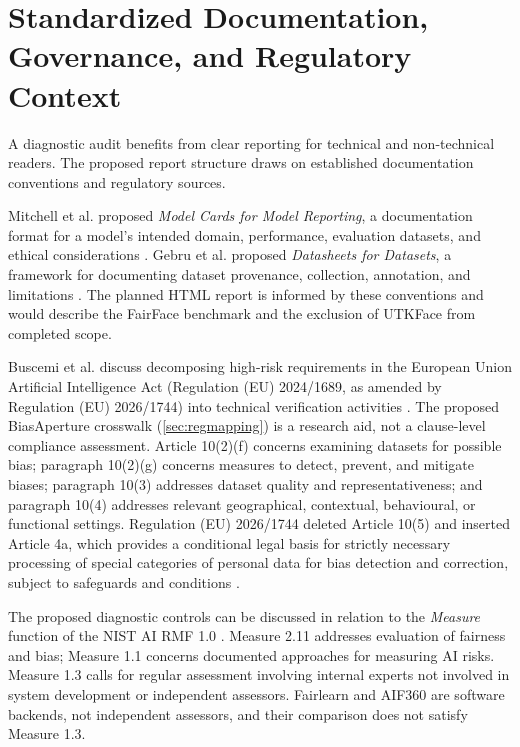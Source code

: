 \section{Standardized Documentation, Governance, and Regulatory Context}
\label{sec:lit_governance}

A diagnostic audit benefits from clear reporting for technical and non-technical readers. The proposed report structure draws on established documentation conventions and regulatory sources.

Mitchell et al. proposed \emph{Model Cards for Model Reporting}, a documentation format for a model's intended domain, performance, evaluation datasets, and ethical considerations \cite{mitchell2019modelcards}. Gebru et al. proposed \emph{Datasheets for Datasets}, a framework for documenting dataset provenance, collection, annotation, and limitations \cite{gebru2018datasheets}. The planned HTML report is informed by these conventions and would describe the FairFace benchmark and the exclusion of UTKFace from completed scope.

Buscemi et al. discuss decomposing high-risk requirements in the European Union Artificial Intelligence Act (Regulation (EU) 2024/1689, as amended by Regulation (EU) 2026/1744) into technical verification activities \cite{buscemi2025assessing,euaiact2024,euomnibus2026}. The proposed BiasAperture crosswalk (\cref{sec:regmapping}) is a research aid, not a clause-level compliance assessment. Article 10(2)(f) concerns examining datasets for possible bias; paragraph 10(2)(g) concerns measures to detect, prevent, and mitigate biases; paragraph 10(3) addresses dataset quality and representativeness; and paragraph 10(4) addresses relevant geographical, contextual, behavioural, or functional settings. Regulation (EU) 2026/1744 deleted Article 10(5) and inserted Article 4a, which provides a conditional legal basis for strictly necessary processing of special categories of personal data for bias detection and correction, subject to safeguards and conditions \cite{euomnibus2026}.

The proposed diagnostic controls can be discussed in relation to the \emph{Measure} function of the NIST AI RMF 1.0 \cite{nist2023aiframework}. Measure 2.11 addresses evaluation of fairness and bias; Measure 1.1 concerns documented approaches for measuring AI risks. Measure 1.3 calls for regular assessment involving internal experts not involved in system development or independent assessors. Fairlearn and AIF360 are software backends, not independent assessors, and their comparison does not satisfy Measure 1.3.


